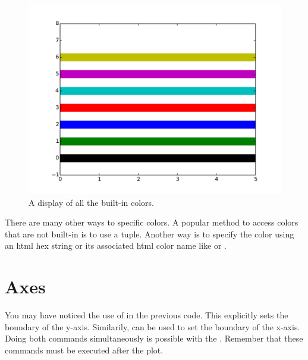 \begin{figure}  %
\includegraphics[width=\textwidth]{colors.pdf}
\caption{A display of all the built-in colors.}
\label{colors} 
\end{figure}

There are many other ways to specific colors.
A popular method to access colors that are not built-in is to use a  tuple.
Another way is to specify the color using an html hex string or its associated html color name like  or . 

\section*{Axes} %

You may have noticed the use of  in the previous code. This explicitly sets the boundary of the y-axis. Similarily,  can be used to set the boundary of the x-axis. 
Doing both commands simultaneously is possible with the . 
Remember that these commands must be executed after the plot. 

